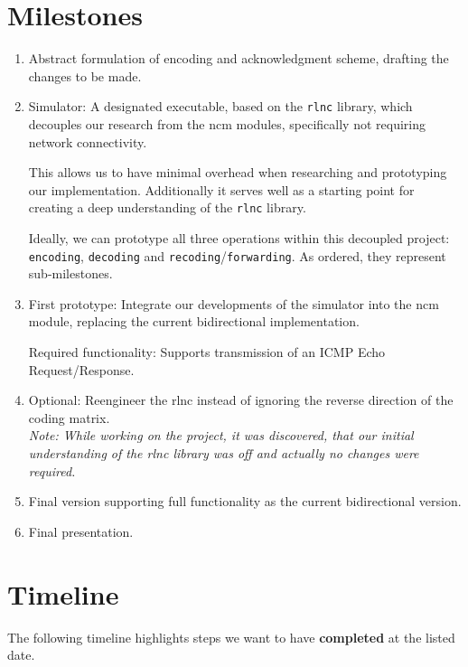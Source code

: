 \documentclass[a4paper, 11pt]{article}
\newcommand{\ilc}[1]{\texttt{#1}} %
\begin{document}
    \section{Milestones}\label{sec:milestones}
    \begin{enumerate}
        \item Abstract formulation of encoding and acknowledgment scheme, drafting the changes to be made.
        \item Simulator: A designated executable, based on the \ilc{rlnc} library, which decouples our
            research from the ncm modules, specifically not requiring network connectivity.

            This allows us to have minimal overhead when researching and prototyping our implementation.
            Additionally it serves well as a starting point for creating a deep understanding of the \ilc{rlnc} library.

            Ideally, we can prototype all three operations within this decoupled project:
            \ilc{encoding}, \ilc{decoding} and \ilc{recoding}/\ilc{forwarding}.
            As ordered, they represent sub-milestones.
        \item First prototype: Integrate our developments of the simulator into the ncm module,
            replacing the current bidirectional implementation.

            Required functionality: Supports transmission of an ICMP Echo Request/Response.
        \item Optional: Reengineer the rlnc instead of ignoring the reverse direction of the coding matrix.\\
        \textit{Note: While working on the project, it was discovered, that our initial understanding of the rlnc
        library was off and actually no changes were required.}
        \item Final version supporting full functionality as the current bidirectional version.
        \item Final presentation.
    \end{enumerate}

    \section{Timeline}\label{sec:timeline}
    The following timeline highlights steps we want to have \textbf{completed} at the listed date.
\end{document}
